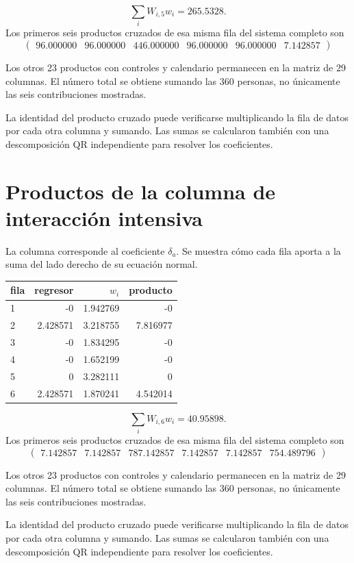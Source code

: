 \documentclass[11pt,a4paper]{article}
\begin{document}
\[
\sum_iW_{i,5}w_i=265.5328.
\]
Los primeros seis productos cruzados de esa misma fila del sistema completo son
\[
\begin{pmatrix}96.000000 & 96.000000 & 446.000000 & 96.000000 & 96.000000 & 7.142857\end{pmatrix}
\]

Los otros 23 productos con controles y calendario permanecen en la matriz de 29 columnas. El número total se obtiene sumando las 360 personas, no únicamente las seis contribuciones mostradas.

La identidad del producto cruzado puede verificarse multiplicando la fila de datos por cada otra columna y sumando. Las sumas se calcularon también con una descomposición QR independiente para resolver los coeficientes.

\clearpage
\section{Productos de la columna de interacción intensiva}
La columna corresponde al coeficiente $\delta_a$. Se muestra cómo cada fila aporta a la suma del lado derecho de su ecuación normal.
\begin{center}\small
\begin{tabular}{lrrr}
\toprule
fila & regresor & $w_i$ & producto\\\midrule
1 & -0 & 1.942769 & -0\\
2 & 2.428571 & 3.218755 & 7.816977\\
3 & -0 & 1.834295 & -0\\
4 & -0 & 1.652199 & -0\\
5 & 0 & 3.282111 & 0\\
6 & 2.428571 & 1.870241 & 4.542014\\
\bottomrule
\end{tabular}\end{center}

\[
\sum_iW_{i,6}w_i=40.95898.
\]
Los primeros seis productos cruzados de esa misma fila del sistema completo son
\[
\begin{pmatrix}7.142857 & 7.142857 & 787.142857 & 7.142857 & 7.142857 & 754.489796\end{pmatrix}
\]

Los otros 23 productos con controles y calendario permanecen en la matriz de 29 columnas. El número total se obtiene sumando las 360 personas, no únicamente las seis contribuciones mostradas.

La identidad del producto cruzado puede verificarse multiplicando la fila de datos por cada otra columna y sumando. Las sumas se calcularon también con una descomposición QR independiente para resolver los coeficientes.
\end{document}
